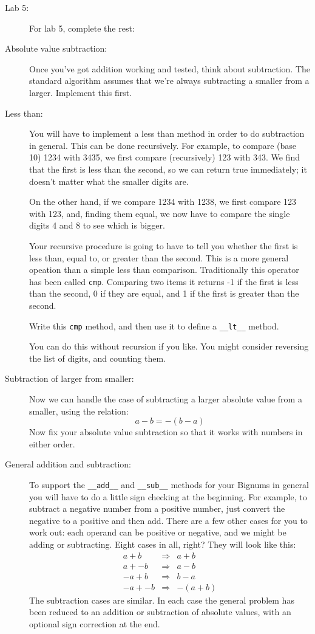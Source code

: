 \documentclass{article}
\begin{document}
\begin{description}
\item[Lab 5:]  For lab 5, complete the rest:

\item[Absolute value subtraction:]  Once you've got addition working
and tested, think about subtraction.  The standard algorithm
assumes that we're always subtracting a smaller from a larger.
Implement this first.

\item[Less than:]  You will have to implement a less than
method in order to do subtraction in general.  This can be
done recursively.  For example, to compare (base 10) 1234
with 3435, we first compare (recursively) 123 with 343.
We find that the first is less than the second, so we can return
true immediately; it doesn't matter what the smaller digits are.

On the other hand, if we compare 1234 with 1238, we first
compare 123 with 123, and, finding them equal, we now have
to compare the single digits 4 and 8 to see which is bigger.

Your recursive procedure is going to have to tell you whether the
first is less than, equal to, or greater than the second.  This is a 
more general opeation than a simple less than comparison.
Traditionally this operator has been called {\tt cmp}.  Comparing
two items it returns -1 if the first is less than the second, 0
if they are equal, and 1 if the first is greater than the second.

Write this  {\tt cmp} method, and then use it to
define a \lstinline{__lt__} method. 

You can do this without recursion if you like.  You might consider
reversing the list of digits, and counting them.

\item[Subtraction of larger from smaller:]
Now we can handle the case of subtracting a larger absolute value
from a smaller, using the relation:
\[
a - b = -(b - a)
\]
Now fix your absolute value subtraction so that it works 
with numbers in either order.

\item[General addition and subtraction:]  
 To support the \lstinline{__add__} and \lstinline{__sub__} methods
for your Bignums in general
you will have to do a little sign checking at the beginning.  For example,
to subtract a negative number from a positive number, just convert the negative
to a positive and then add. 
There are a few
other cases for you to work out: each operand can be positive or negative,
and we might be adding or subtracting.  Eight cases in all, right?  They 
will look like this:
\[
\begin{array}{rcl}
a + b & \Rightarrow & a + b \\
a + -b & \Rightarrow & a - b \\
-a + b &\Rightarrow& b - a \\
-a + -b &\Rightarrow& -(a+b)
\end{array}
\]
The subtraction cases are similar.  In each case the general problem
has been reduced to an addition or subtraction of absolute values,
with an optional sign correction at the end.


\end{description}
\end{document}
